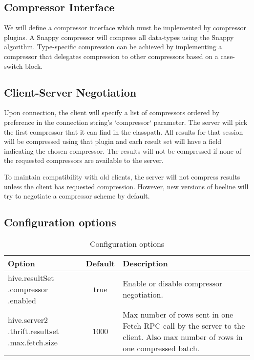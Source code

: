 \documentclass[11pt,a4paper]{article}
\begin{document}
	\subsection{Compressor Interface}
		We will define a compressor interface which must be implemented by compressor plugins.
		A Snappy compressor will compress all data-types using the Snappy algorithm.
		Type-specific compression can be achieved by implementing a compressor that delegates compression to other compressors based on a case-switch block.
		
	\subsection{Client-Server Negotiation}
		Upon connection, the client will specify a list of compressors ordered by preference in the connection string's `compressor` parameter.
		The server will pick the first compressor that it can find in the classpath.
		All results for that session will be compressed using that plugin and each result set will have a field indicating the chosen compressor.
		The results will not be compressed if none of the requested compressors are available to the server.
		
		To maintain compatibility with old clients, the server will not compress results unless the client has requested compression.
		However, new versions of beeline will try to negotiate a compressor scheme by default.
		
	\subsection{Configuration options}
		\begin{table}[H]
			\begin{tabular}{| p{3cm} | c | p{6.5cm} |} \hline
				\textbf{Option} & \textbf{Default} & \textbf{Description} \\ \hline
					hive.resultSet\linebreak
					.compressor\linebreak
					.enabled
				 & true & Enable or disable compressor negotiation. \\ \hline
					 hive.server2\linebreak
					 .thrift.resultset\linebreak
					 .max.fetch.size
				 & 1000 & Max number of rows sent in one Fetch RPC call by the server to the client. Also max number of rows in one compressed batch.
				 \\ \hline
			\end{tabular}
			\caption{Configuration options}
		\end{table}
\end{document}
